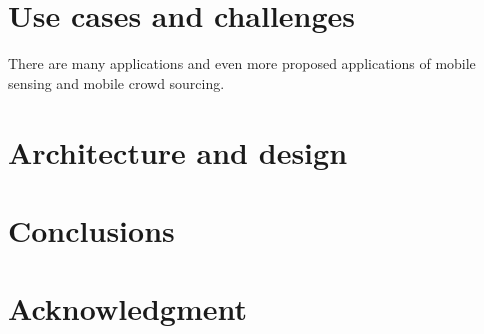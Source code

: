 \documentclass[conference,letterpaper]{IEEEtran}
\begin{document}
\section{Use cases and challenges}
\label{sec:use_cases}
There are many applications and even more proposed applications of mobile sensing and mobile crowd sourcing. 
\section{Architecture and design}
\label{sec:design}
\section{Conclusions}
\label{sec:conclusion_and_future_work}
\section{Acknowledgment}
\label{sec:acknowledgment}
\end{document}
